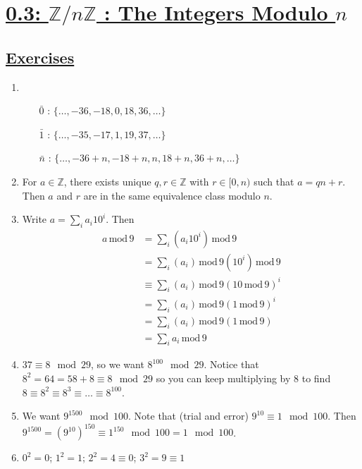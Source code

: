 \documentclass[]{article}
\newcommand{\md}{\,\text{mod}\,}
\newcommand{\bbz}{\mathbb{Z}}
\begin{document}
\section*{\underline{0.3: $\bbz/n\bbz$ : The Integers Modulo $n$}}

\subsection*{\underline{Exercises}}
\begin{enumerate}
\item \begin{enumerate}
\item[$\bar{0}$]: $\{ \ldots, -36, -18, 0, 18, 36, \ldots \}$ 
\item[$\bar{1}$]: $\{ \ldots, -35, -17, 1, 19, 37, \ldots \}$ 
\item[$\bar{n}$]: $\{ \ldots, -36+n, -18+n, n, 18+n, 36+n, \ldots \}$ 
\end{enumerate}
\item For $a \in \bbz$, there exists unique $q,r\in \bbz$ with $r\in [0,n)$ such that $a = qn+r$. Then $a$ and $r$ are in the same equivalence class modulo $n$.
\item Write $a = \sum_i a_i10^i$. Then 
\begin{align}
a\md 9 &= \sum_i \left(a_i10^i\right)\md 9 \\
&= \sum_i \left(a_i\right)\md 9 \left(10^i\right)\md 9 \\
&\equiv \sum_i \left(a_i\right)\md 9 \left(10\md 9\right)^i \\
&= \sum_i \left(a_i\right)\md 9 \left(1\md 9\right)^i \\
&= \sum_i \left(a_i\right)\md 9 \left(1\md 9\right) \\
&= \sum_i a_i\md 9
\end{align}
\item $37 \equiv 8\mod 29$, so we want $8^{100}\mod 29$. Notice that $8^2 = 64 = 58+8 \equiv 8\mod 29$ so you can keep multiplying by 8 to find $8 \equiv 8^2 \equiv 8^3 \equiv \ldots \equiv 8^{100}$.
\item We want $9^{1500}\mod 100$. Note that (trial and error) $9^10 \equiv 1\mod 100$. Then $9^{1500} = (9^{10})^{150} \equiv 1^{150}\mod 100 = 1\mod 100$.
\item $0^2 = 0$; $1^2 = 1$; $2^2 = 4 \equiv 0$; $3^2 = 9 \equiv 1$

\end{enumerate}
\end{document}
